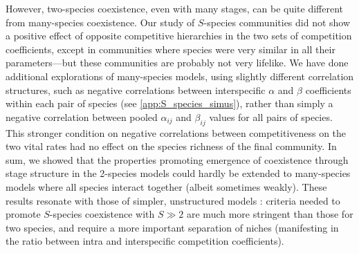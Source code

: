 \documentclass{article}
\begin{document}
However, two-species coexistence, even with many stages, can be quite different from many-species coexistence. Our study of $S$-species communities did not show a positive effect of opposite competitive hierarchies in the two sets of competition coefficients, except in communities where species were very similar in all their parameters---but these communities are probably not very lifelike. We have done additional explorations of many-species models, using slightly different correlation structures, such as negative correlations between interspecific $\alpha$ and $\beta$ coefficients within each pair of species (see \ref{app:S_species_simus}), rather than simply a negative correlation between pooled $\alpha_{ij}$ and $\beta_{ij}$ values for all pairs of species. This stronger condition on negative correlations between competitiveness on the two vital rates had no effect on the species richness of the final community. In sum, we showed that the properties promoting emergence of coexistence through stage structure in the 2-species models could hardly be extended to many-species models where all species interact together (albeit sometimes weakly). These results resonate with those of simpler, unstructured models \citep{barabas2016effect}: criteria needed to promote $S$-species coexistence with $S \gg 2$ are much more stringent than those for two species, and require a more important separation of niches (manifesting in the ratio between intra and interspecific competition coefficients). 
\end{document}
